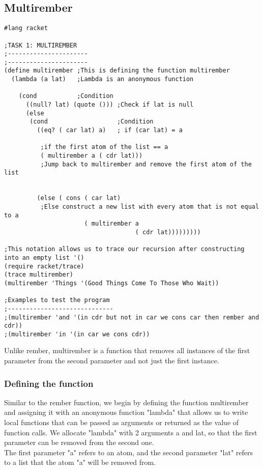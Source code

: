 \documentclass{article}
\begin{document}
\subsection{Multirember}
\begin{lstlisting}
#lang racket

;TASK 1: MULTIREMBER
;----------------------
;----------------------
(define multirember ;This is defining the function multirember
  (lambda (a lat)   ;Lambda is an anonymous function
    
    (cond           ;Condition
      ((null? lat) (quote ())) ;Check if lat is null
      (else
       (cond                   ;Condition
         ((eq? ( car lat) a)   ; if (car lat) = a

          ;if the first atom of the list == a
          ( multirember a ( cdr lat)))
          ;Jump back to multirember and remove the first atom of the list

         
         (else ( cons ( car lat)
          ;Else construct a new list with every atom that is not equal to a
                      ( multirember a
                                    ( cdr lat)))))))))

;This notation allows us to trace our recursion after constructing into an empty list '()
(require racket/trace)
(trace multirember)
(multirember 'Things '(Good Things Come To Those Who Wait))

;Examples to test the program
;-----------------------------
;(multirember 'and '(in cdr but not in car we cons car then rember and cdr))
;(multirember 'in '(in car we cons cdr))
\end{lstlisting}
Unlike rember, multirember is a function that removes all instances of the first parameter from the second parameter and not just the first instance.

\subsubsection{Defining the function}
Similar to the rember function, we begin by defining the function multirember and assigning it with an anonymous function "lambda" that allows us to write local functions that can be passed as arguments or returned as the value of function calls.
 We allocate "lambda" with 2 arguments a and lat, so that the first parameter can be removed from the second one.\\
 
The first parameter "a" refers to an atom, and the second parameter "lat" refers to a list that the atom "a" will be removed from.
\end{document}
